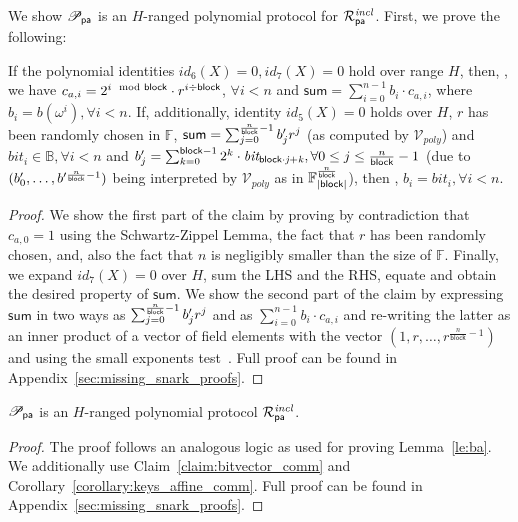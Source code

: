 \noindent We show $\mathscr{P}_{\mathsf{pa}}$ is an $H$-ranged polynomial protocol 
for $\mathcal{R}^{\mathit{incl}}_{\mathsf{pa}}$. First, we prove the following:

\begin{test_claim}
\label{claim:bitvector_comm}
If the polynomial identities $id_6(X) = 0, id_7(X) = 0$ hold over range $H$, then, 
\ewnp, 
we have $c_{a,i} =  2^{i \mod {\mathsf{block}}} \cdot r^{i \div \mathsf{block}}$, $\forall i < n$ and $\mathsf{sum} = \sum_{i=0}^{n-1}b_i \cdot c_{a,i}$, 
where $b_i = b(\omega^i), \forall i <n$. If, additionally, identity $id_5(X) = 0$ holds over $H$, 
$r$ has been randomly chosen in $\mathbb{F}$, $\mathsf{sum} = \sum_{j=0}^{\frac{n}{\mathsf{block}}-1} b'_{j}r^j$ 
(as computed by $\mathcal{V}_{poly}$) and $\mathit{bit_{i}} \in \mathbb{B}, \forall i < n$ and 
$b'_{j} = \sum_{k=0}^{\mathsf{block} -1}2^k \cdot \mathit{bit_{\mathsf{block} \cdot j + k}}, \forall 0 \leq j \leq \frac{n}{\mathsf{block}} -1$ 
(due to  $(b'_{0}, \ldots, b'^{\frac{n}{\mathsf{block}} -1})$ 
being interpreted by $\mathcal{V}_{poly}$ as in $\mathbb{F}_{|\mathsf{block}|}^{\frac{n}{\mathsf{block}}}$), then \ewnp, 
$b_i = \mathit{bit_{i}}, \forall i <n$.
\end{test_claim}
\vspace{-0.15in}

\begin{proof}
We show the first part of the claim by proving by contradiction that $c_{a,0} =1$ using the Schwartz-Zippel Lemma, the fact that $r$ has been 
randomly chosen, and, also the fact that $n$ is negligibly smaller than the size of $\mathbb{F}$. Finally, we expand $\mathit{id_7}(X) = 0$ 
over $H$, sum the LHS and the RHS, equate and obtain the desired property of $\mathsf{sum}$. We show the second part of 
the claim by expressing $\mathsf{sum}$ in two ways as $\sum_{j=0}^{\frac{n}{\mathsf{block}}-1} b'_{j}r^j $ and as $\sum_{i=0}^{n-1} b_i \cdot c_{a,i}$ and re-writing the 
latter as an inner product of a vector of field elements with the vector $(1, r, \ldots, r^{\frac{n}{\mathsf{block}}-1})$ and using the small exponents test~\cite{small_exponents}. 
Full proof can be found in Appendix~\ref{sec:missing_snark_proofs}.
\end{proof}
\vspace{-0.1in}

\begin{lemma} 
$\mathscr{P}_{\mathsf{pa}}$ is an $H$-ranged polynomial protocol $\mathcal{R}^{\mathit{incl}}_{\mathsf{pa}}$.
\end{lemma}
\vspace{-0.15in}

\begin{proof} 
The proof follows an analogous logic as used for proving Lemma~\ref{le:ba}. We additionally use 
Claim~\ref{claim:bitvector_comm} and Corollary~\ref{corollary:keys_affine_comm}. Full proof can be found in Appendix~\ref{sec:missing_snark_proofs}.
\end{proof}
\vspace{-0.15in}

